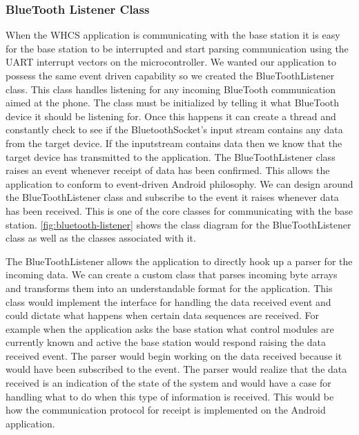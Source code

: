 
\subsubsection{BlueTooth Listener Class} When the WHCS application is
communicating with the base station it is easy for the base station to be
interrupted and start parsing communication using the UART interrupt vectors on
the microcontroller. We wanted our application to possess the same event driven
capability so we created the BlueToothListener class. This class handles
listening for any incoming BlueTooth communication aimed at the phone. The
class must be initialized by telling it what BlueTooth device it should be
listening for. Once this happens it can create a thread and constantly check to
see if the BluetoothSocket{}'s input stream contains any data from the target
device. If the inputstream contains data then we know that the target device
has transmitted to the application. The BlueToothListener class raises an event
whenever receipt of data has been confirmed. This allows the application to
conform to event{}-driven Android philosophy. We can design around the
BlueToothListener class and subscribe to the event it raises whenever data has
been received. This is one of the core classes for communicating with the base
station. \autoref{fig:bluetooth-listener} shows the class diagram for the
BlueToothListener class as well as the classes associated with it.


The BlueToothListener allows the application to directly hook up a parser for
the incoming data. We can create a custom class that parses incoming byte
arrays and transforms them into an understandable format for the application.
This class would implement the interface for handling the data received event
and could dictate what happens when certain data sequences are received. For
example when the application asks the base station what control modules are
currently known and active the base station would respond raising the data
received event. The parser would begin working on the data received because it
would have been subscribed to the event. The parser would realize that the data
received is an indication of the state of the system and would have a case for
handling what to do when this type of information is received. This would be
how the communication protocol for receipt is implemented on the Android
application.

